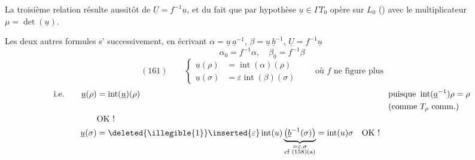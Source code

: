 La troisième relation résulte aussitôt de $\underline U=f^{-1}\underline u$, et du fait que par hypothèse  $\underline u\in\Gamma T_0$ opère sur $L_0$ () avec le multiplicateur $\mu=\det(\underline u)$.


Les deux autres formules s' successivement, en écrivant $\alpha=\underline u\,\underline a^{-1}$, $\beta=\underline u\,\underline b^{-1}$, $\underline U=f^{-1}\underline u$
\[
\alpha_0=f^{-1}\alpha,\quad\beta_0=f^{-1}\beta
\]
\[
(161)\qquad
\left\{
\begin{aligned}
\underline u(\rho)&=\operatorname{int}(\alpha)(\rho)\\
\underline u(\sigma)&=\varepsilon\operatorname{int}(\beta)(\sigma)
\end{aligned}
\right.
\qquad\text{où }f\text{ ne figure plus}
\]
\[
\begin{aligned}
\text{i.e.}\qquad\underline u(\rho)&=\operatorname{int}(\underline u)(\rho)
&&\text{puisque }\operatorname{int}(\underline a^{-1})\rho=\rho\\
&&&\text{(comme }T_\rho\text{ comm.)}\\
&\text{OK !}\\
\underline u(\sigma)&=\deleted{\illegible{1}}\inserted{\varepsilon}\operatorname{int}(u)
\underbrace{\bigl(\underline b^{-1}(\sigma)\bigr)}_{\substack{=\varepsilon.\sigma\\\text{cf (158)(a)}}}
=\operatorname{int}(u)\sigma\quad\text{OK !}
\end{aligned}
\]

